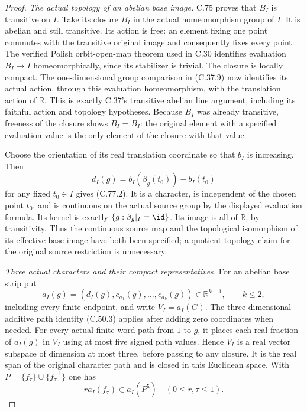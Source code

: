 \begin{proof}
\emph{The actual topology of an abelian base image.}
C.75 proves that $B_I$ is transitive on $I$. Take its
closure $\overline B_I$ in the actual homeomorphism group
of $I$. It is abelian and still transitive. Its action
is free: an element fixing one point commutes with the
transitive original image and consequently fixes every
point. The verified Polish orbit-open-map theorem used
in C.30 identifies evaluation
$\overline B_I\to I$ homeomorphically, since its
stabilizer is trivial. The closure is locally compact.
The one-dimensional group comparison in (C.37.9) now
identifies its actual action, through this evaluation
homeomorphism, with the translation action of $\mathbb R$.
This is exactly C.37's transitive abelian line argument,
including its faithful action and topology hypotheses.
Because $B_I$ was already transitive, freeness of the
closure shows $B_I=\overline B_I$: the original element
with a specified evaluation value is the only element
of the closure with that value.

Choose the orientation of its real translation coordinate
so that $b_I$ is increasing. Then
\[
              d_I(g)=b_I(\beta_g(t_0))-b_I(t_0)
                                                               \tag{C.77.5}
\]
for any fixed $t_0\in I$ gives (C.77.2).
It is a character, is independent of the chosen point
$t_0$, and is continuous on the actual source group
by the displayed evaluation formula. Its kernel is
exactly $\{g:\beta_g|_I=\id\}$. Its image is all of
$\mathbb R$, by transitivity. Thus the continuous source
map and the topological isomorphism of its effective
base image have both been specified; a quotient-topology
claim for the original source restriction is unnecessary.

\emph{Three actual characters and their compact representatives.}
For an abelian base strip put
\[
       a_I(g)=(d_I(g),c_{a_1}(g),\ldots,c_{a_k}(g))
                    \in\mathbb R^{k+1},\qquad k\leq2,
                                                               \tag{C.77.6}
\]
including every finite endpoint, and write $V_I=a_I(G)$.
The three-dimensional additive path identity (C.50.3)
applies after adding zero coordinates when needed.
For every actual finite-word path from $1$ to $g$, it
places each real fraction of $a_I(g)$ in $V_I$ using
at most five signed path values. Hence $V_I$ is a real
vector subspace of dimension at most three, before
passing to any closure. It is the real span of the
original character path and is closed in this Euclidean
space. With $P=\{f_\tau\}\cup\{f_\tau^{-1}\}$ one has
\[
             r a_I(f_\tau)\in a_I(P^5)
                               \quad(0\leq r,\tau\leq1).
                                                               \tag{C.77.7}
\]


\end{proof}
